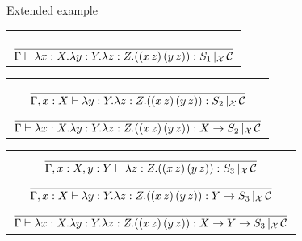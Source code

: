 \documentclass[8pt]{beamer}
\begin{document}
\begin{frame}{Extended example}
\footnotesize
    \begin{center}
        \begin{overprint}
            \begin{tabular}{c}
                {}\\
                {}\\
                $\displaystyle {{}\over{\Gamma \vdash \lambda x:X.  
                \lambda y:Y.\lambda z:Z.  ((x\, z)\, (y \, 
                z)):S_1\,|_{\mathcal{X}}\, \mathcal{C}}}$
            \end{tabular}
                \begin{tabular}{c}
                {}\\
                $\displaystyle {{{}\over{\Gamma, x:X \vdash \lambda 
                    y:Y.\lambda z:Z.  ((x\, z)\, (y \, 
                    z)):S_2\,|_{\mathcal{X}}\, \mathcal{C}}}} $\\
                $\displaystyle {{}
                    \over{\Gamma \vdash \lambda x:X. \lambda y:Y.\lambda z:Z.
                    ((x\, z)\, (y \, z)):X \rightarrow S_2
                \,|_{\mathcal{X}}\, \mathcal{C}}}$
                \end{tabular}
                \begin{tabular}{c}
                $\displaystyle {{{}\over{\Gamma, x:X, y:Y \vdash 
                    \lambda z:Z.  ((x\, z)\, (y \, 
                    z)):S_3\,|_{\mathcal{X}}\, \mathcal{C}}}} $\\
                $\displaystyle {{{}\over{\Gamma, x:X \vdash \lambda 
                    y:Y.\lambda z:Z.  ((x\, z)\, (y \, z)):Y 
                    \rightarrow S_3\,|_{\mathcal{X}}\, \mathcal{C}}}} 
                    $\\
                $\displaystyle {{}
                    \over{\Gamma \vdash \lambda x:X. \lambda y:Y.\lambda z:Z.
                    ((x\, z)\, (y \, z)):X \rightarrow Y \rightarrow 
                S_3\,|_{\mathcal{X}}\, \mathcal{C}}}$
                \end{tabular}
\end{overprint}
\end{center}
\end{frame}
\end{document}
